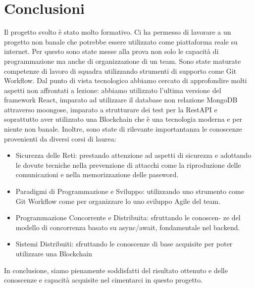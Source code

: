 \section{Conclusioni}

Il progetto svolto è stato molto formativo. Ci ha permesso
di lavorare a un progetto non banale che potrebbe essere 
utilizzato come piattaforma reale su internet. Per questo sono 
state messe alla prova non solo le capacità di programmazione ma anche di 
organizzazione di un team. Sono state maturate competenze di lavoro di squadra utilizzando 
strumenti di supporto come Git Workflow.
Dal punto di vista tecnologico abbiamo cercato di approfondire molti aspetti
non affrontati a lezione: abbiamo utilizzato l’ultima versione del
framework React, imparato ad utilizzare il database non relazione MongoDB attraverso moongose, imparato a strutturare dei test per la RestAPI 
e soprattutto aver utilizzato una Blockchain che è una tecnologia moderna e per niente non banale.
Inoltre, sono state di rilevante importantanza le conoscenze provenienti da diversi corsi di laurea:
\begin{itemize}
	\item  Sicurezza delle Reti: prestando attenzione ad aspetti di sicurezza e adottando le dovute tecniche nella
prevenzione di attacchi come la riproduzione delle comunicazioni e nella memorizzazione delle password.
	\item Paradigmi di Programmazione e Sviluppo: utilizzando uno strumento come Git Workflow come per organizzare lo uno sviluppo Agile del team.
    \item Programmazione Concorrente e Distribuita: sfruttando le conoscen-
ze del modello di concorrenza basato su async/await, fondamentale nel backend.
    \item Sistemi Distribuiti: sfruttando le conoscenze di base acquisite per poter utilizzare una Blockchain 
\end{itemize}

In conclusione, siamo pienamente soddisfatti del risultato ottenuto e delle
conoscenze e capacità acquisite nel cimentarci in questo progetto.